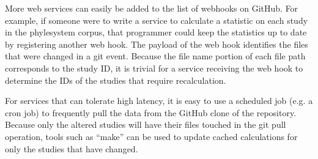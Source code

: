 \documentclass{bioinfo}
\newcommand{\ps}{phylesystem\xspace}
\begin{document}
\begin{methods}
More web services can easily be added to the list of webhooks on GitHub.
For example, if someone were to write a service to calculate a statistic on each study in the \ps corpus, that
    programmer could keep the statistics up to date by registering another web hook.
The payload of the web hook identifies the files that were changed in a git event.
Because the file name portion of each file path corresponds to the study ID, it is trivial for a service
    receiving the web hook to determine the IDs of the studies that require recalculation.

For services that can tolerate high latency, it is easy to use a scheduled job (e.g. a cron job) to 
    frequently pull the data from the GitHub clone of the repository.
Because only the altered studies will have their files touched in the git pull operation, tools such
    as ``make'' can be used to update cached calculations for only the studies that have changed.
\end{methods}
    
\end{document}
